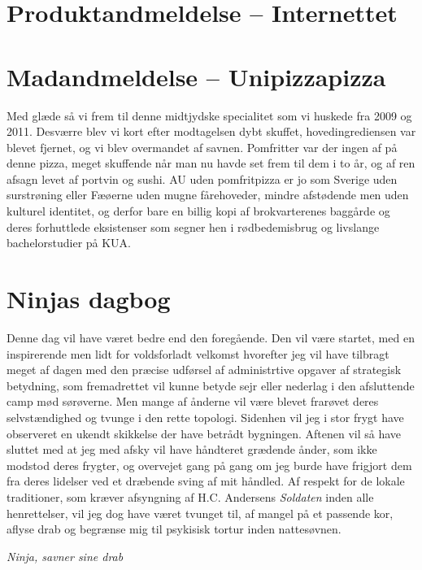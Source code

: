 \begin{minipage}[t]{100mm}
\vspace{1mm}
\section*{Produktandmeldelse -- Internettet}


\vspace{1mm}
\section*{Madandmeldelse -- Unipizzapizza}
\vspace{2mm}
Med glæde så vi frem til denne midtjydske specialitet som vi huskede fra 2009 og 2011. Desværre blev vi kort efter modtagelsen dybt skuffet, hovedingrediensen var blevet fjernet, og vi blev overmandet af savnen. Pomfritter var der ingen af på denne pizza, meget skuffende når man nu havde set frem til dem i to år, og af ren afsagn levet af portvin og sushi. AU uden pomfritpizza er jo som Sverige uden surstrøning eller Fæøerne uden mugne fårehoveder, mindre afstødende men uden kulturel identitet, og derfor bare en billig kopi af brokvarterenes baggårde  og deres forhuttlede eksistenser som segner hen i rødbedemisbrug og livslange bachelorstudier på KUA. 

\section*{Ninjas dagbog}
Denne dag vil have været bedre end den foregående. Den vil være startet, med en inspirerende men lidt for voldsforladt velkomst hvorefter jeg vil have tilbragt meget af dagen med den præcise udførsel af administrtive opgaver af strategisk betydning, som fremadrettet vil kunne betyde sejr eller nederlag i den afsluttende camp mød sørøverne. Men mange af ånderne vil være blevet frarøvet deres selvstændighed og tvunge i den rette topologi. Sidenhen vil jeg i stor frygt have observeret en ukendt skikkelse der have betrådt bygningen. Aftenen vil så have sluttet med at jeg med afsky vil have håndteret grædende ånder, som ikke modstod deres frygter, og overvejet gang på gang om jeg burde have frigjort dem fra deres lidelser ved et dræbende sving af mit håndled. Af respekt for de lokale traditioner, som kræver afsyngning af H.C. Andersens \emph{Soldaten} inden alle henrettelser, vil jeg dog have været tvunget til, af mangel på et passende kor, aflyse drab og begrænse mig til psykisisk tortur inden nattesøvnen.

{\flushright\emph{Ninja, savner sine drab}}

\end{minipage}

